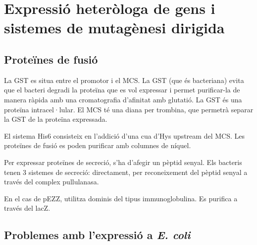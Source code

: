\section{Expressió heteròloga de gens i sistemes de mutagènesi dirigida}
\label{sec:expr-heter-de}

\subsection{Proteïnes de fusió}
\label{sec:proteines-de-fusio}

La GST es situa entre el promotor i el MCS. La GST (que és bacteriana) evita que el bacteri degradi la proteïna que es vol expressar i permet purificar-la de manera ràpida amb una cromatografia d'afinitat amb glutatió. La GST és una proteïna intracel·lular. El MCS té una diana per trombina, que permetrà separar la GST de la proteïna expressada.

El sistema His6 consisteix en l'addició d'una cua d'Hys upstream del MCS. Les proteïnes de fusió es poden purificar amb columnes de níquel.

Per expressar proteïnes de secreció, s'ha d'afegir un pèptid senyal. Els bacteris tenen 3 sistemes de secreció: directament, per reconeixement del pèptid senyal a través del complex pullulanasa.

En el cas de pEZZ, utilitza dominis del tipus immunoglobulina. Es purifica a través del lacZ.

\subsection{Problemes amb l'expressió a \textit{E. coli}}
\label{sec:probl-amb-lexpr}


